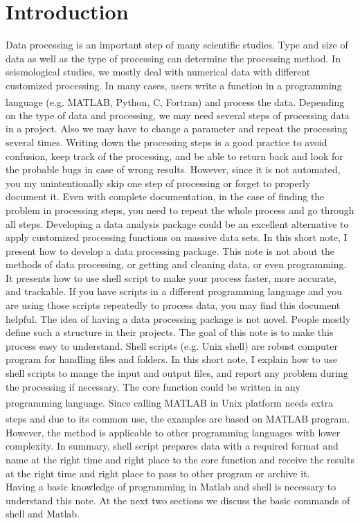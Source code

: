 \section{Introduction}
Data processing is an important step of many scientific studies. Type and size of data as well as the type of processing can determine the processing method. In seismological studies, we mostly deal with numerical data with different customized processing. In many cases, users write a function in a programming language (e.g. MATLAB\textsuperscript{\textregistered}, Python, C, Fortran) and process the data. Depending on the type of data and processing, we may need several steps of processing data in a project. Also we may have to change a parameter and repeat the processing several times.  Writing down the processing steps is a good practice to avoid confusion, keep track of the processing, and be able to return back and look for the probable bugs in case of wrong results. However, since it is not automated, you my unintentionally skip one step of processing or forget to properly document it. Even with complete documentation, in the case of finding the problem in processing steps, you need to repeat the whole process and go through all steps. Developing a data analysis package could be an excellent alternative to apply customized processing functions on massive data sets. In this short note, I present how to develop a data processing package. This note is not about the methods of data processing, or getting and cleaning data, or even programming. It presents how to use shell script to make your process faster, more accurate, and trackable. If you have  scripts in a different programming language and you are using those scripts repeatedly to process data, you may find this document helpful. The idea of having a data processing package is not novel. People mostly define such a structure in their projects. The goal of this note is to make this process easy to understand. Shell scripts (e.g. Unix shell) are robust computer program for handling files and folders. In this short note, I explain how to use shell scripts to mange the input and output files, and report any problem during the processing if necessary. The core function could be written in any programming language. Since calling MATLAB\textsuperscript{\textregistered} in Unix platform needs extra steps and due to its common use, the examples are based on MATLAB\textsuperscript{\textregistered} program. However, the method is applicable to other programming languages with lower complexity.
In summary, shell script prepares  data with a required format and name at the right time and right place to the core function and receive the results at the right time and right place to pass to other program or archive it.\\
Having a basic knowledge of programming in Matlab and shell is necessary to understand this note. At the next two sections we discuss the basic commands of shell and Matlab. 

